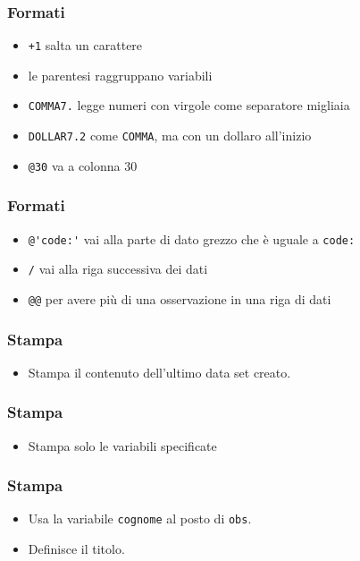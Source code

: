 \begin{frame}[containsverbatim]\frametitle{Formati}

  \begin{itemize}
  \item
    \verb!+1! salta un carattere
  \item
    le parentesi raggruppano variabili
  \item
    \verb!COMMA7.! legge numeri con virgole come separatore migliaia
  \item
    \verb!DOLLAR7.2! come \verb!COMMA!, ma con un dollaro all'inizio
  \item
    \verb!@30! va a colonna 30
  \end{itemize}
\end{frame}


\begin{frame}[containsverbatim]\frametitle{Formati}
  \begin{itemize}
  \item
    \verb!@'code:'! vai alla parte di dato grezzo che {\`e} uguale a \verb!code:!
  \item
    \verb!/! vai alla riga successiva dei dati
  \item
    \verb!@@! per avere pi{\`u} di una osservazione in una riga di dati
  \end{itemize}
\end{frame}


\begin{frame}[containsverbatim]\frametitle{Stampa}
  \begin{itemize}
  \item
    Stampa il contenuto dell'ultimo data set creato.
  \end{itemize}\end{frame}

\begin{frame}[containsverbatim]\frametitle{Stampa}
  \begin{itemize}
  \item
    Stampa solo le variabili specificate
  \end{itemize}\end{frame}

\begin{frame}[containsverbatim]\frametitle{Stampa}
  \begin{itemize}
  \item
    Usa la variabile \texttt{cognome} al posto di \texttt{obs}.
  \item
    Definisce il titolo.
  \end{itemize}\end{frame}

